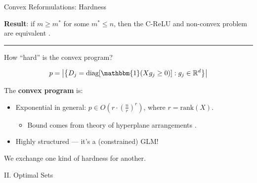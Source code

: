 \documentclass[usenames,dvipsnames,mathserif,notheorems]{beamer}
\newcommand{\horizontalrule}{
	{
			\vspace{-0.5em}
			\center \rule{\textwidth}{0.1em}
			\vspace{-0.2em}
		}
}
\newcommand{\bad}[1]{\textcolor{bad}{#1}}
\newcommand{\good}[1]{\textcolor{good}{#1}}
\begin{document}
\begin{frame}{Convex Reformulations: Hardness}

	\textbf{Result}: if \( m \geq m^* \) for some \( m^* \leq n \),
	then the C-ReLU and non-convex problem are \good{equivalent}
	\citep{pilanci2020convex}.

	\pause
	\horizontalrule

	How ``hard'' is the convex program?
	\pause

	\[
		p = \abs{\cbr{D_j = \text{diag}[\mathbbm{1}(X g_j \geq 0)] : g_j \in \R^d }}
	\]

	\vspace{2em}
	\pause

	The \textbf{convex program} is:
	\vspace{0.5em}
	\begin{itemize}
		\item \bad{Exponential in general}: \( p \in O(r \cdot (\frac{n}{r})^r) \),
		      where \( r = \text{rank}(X) \).
		      \vspace{0.25em}
		      \begin{itemize}
			      \item Bound comes from theory of hyperplane arrangements \citep{winder1966partitions}.
		      \end{itemize}
		      \pause

		      \vspace{0.5em}

		\item Highly \good{structured} --- it's a (constrained) GLM!
	\end{itemize}

	\vspace{1em}
	\pause

	\begin{center}
		\Large
		We exchange one kind of hardness for another.
	\end{center}

\end{frame}

\begin{frame}{}
	\begin{center}
		\huge II. Optimal Sets
	\end{center}
\end{frame}

\end{document}
